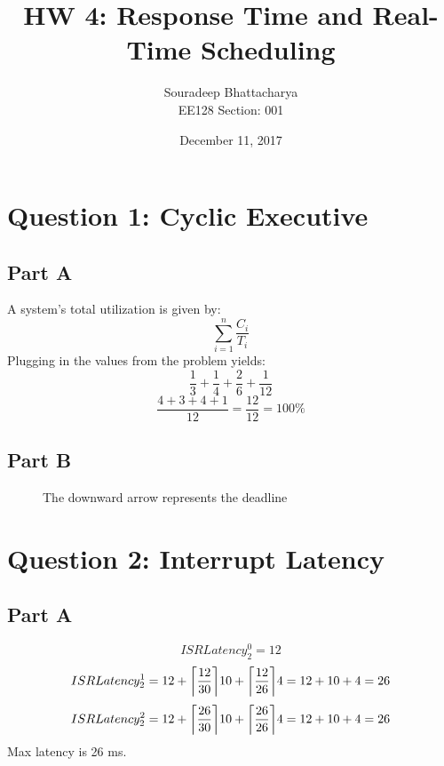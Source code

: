 \documentclass{article}
\title{HW 4: Response Time and Real-Time Scheduling}
\date{December 11, 2017}
\author{Souradeep Bhattacharya \\ EE128 Section: 001}
\DeclarePairedDelimiter\ceil{\lceil}{\rceil}
\begin{document}
	\maketitle
	\section*{Question 1: Cyclic Executive}
	\subsection*{Part A}
	A system's total utilization is given by:
	$$ \sum\limits_{i=1}^n \frac{C_i}{T_i}$$
	Plugging in the values from the problem yields:
	$$ \frac{1}{3}+\frac{1}{4}+\frac{2}{6}+\frac{1}{12}$$
	$$ \frac{4+3+4+1}{12}=\frac{12}{12}=100\% $$
	\subsection*{Part B}
	\begin{figure}[H]
		\begin{RTGrid}[width=11cm,labelsize=\Large]{4}{13}
			
			
			
			
			
			
			
			
			
		\end{RTGrid}
		\centering
		\caption{The downward arrow represents the deadline}
	\end{figure}
	\section*{Question 2: Interrupt Latency}
	\subsection*{Part A}
	$$ ISRLatency_2^0 = 12 $$
	$$ ISRLatency_2^1 = 12 + \ceil*{\frac{12}{30}}10+\ceil*{\frac{12}{26}}4=12+10+4=26$$
	$$ ISRLatency_2^2 = 12 + \ceil*{\frac{26}{30}}10+\ceil*{\frac{26}{26}}4=12+10+4=26$$
	Max latency is 26 ms.
\end{document}
